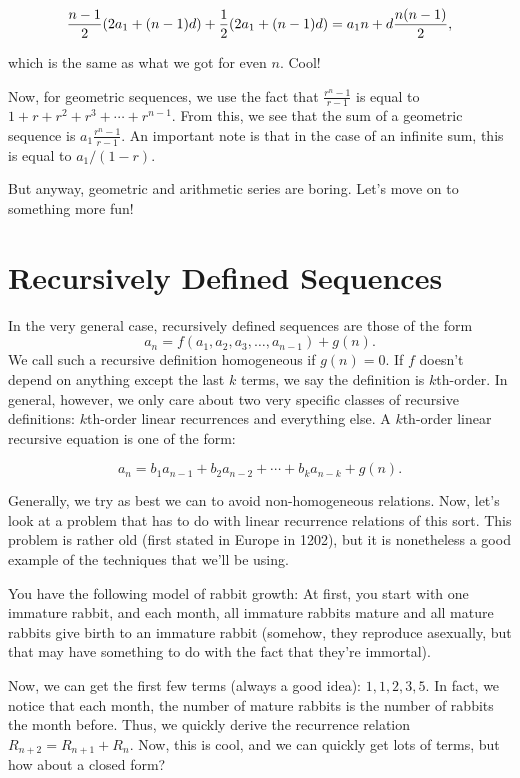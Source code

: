 \documentclass[12pt,letterpaper]{article}
\begin{document}
$$\frac{n-1}{2}(2a_1 + (n-1)d) + \frac{1}{2}(2a_1 + (n-1)d) \\
= a_1 n + d \frac{n (n-1)}{2},$$

which is the same as what we got for even $n$. Cool!

Now, for geometric sequences, we use the fact that $\frac{r^n - 1}{r
  - 1}$ is equal to $1 + r + r^2 + r^3 + \cdots + r^{n-1}$. From this, we
see that the sum of a geometric sequence is $a_1 \frac{r^n - 1}{r -
  1}$. An important note is that in the case of an infinite sum, this
is equal to $a_1/(1 - r)$.

But anyway, geometric and arithmetic series are boring. Let's move on to
something more fun!

\section{Recursively Defined Sequences}
In the very general case, recursively defined sequences are those of
the form $$a_n = f(a_1, a_2, a_3, \ldots, a_{n-1}) + g(n).$$ We call such a
recursive definition homogeneous if $g(n) = 0$. If $f$ doesn't depend
on anything except the last $k$ terms, we say the definition is
$k$th-order. In general, however, we only care about two very
specific classes of recursive definitions: $k$th-order linear recurrences and
everything else. A $k$th-order linear recursive equation is one of
the form:

$$a_n = b_1 a_{n-1} + b_2 a_{n-2} + \cdots + b_k a_{n - k} + g(n).$$

Generally, we try as best we can to avoid non-homogeneous
relations. Now, let's look at a problem that has to do with linear
recurrence relations of this sort. This problem is rather old (first stated
in Europe in 1202), but it is nonetheless a
good example of the techniques that we'll be using.

You have the following model of rabbit growth: At first, you start
with one immature rabbit, and each month, all immature rabbits mature
and all mature rabbits give birth to an immature rabbit (somehow, they
reproduce asexually, but that may have something to do with the fact
that they're immortal).

Now, we can get the first few terms (always a good idea): $1, 1, 2, 3,
5$.  In fact, we notice that each month, the number of mature rabbits
is the number of rabbits the month before. Thus, we quickly derive the
recurrence relation $R_{n+2} = R_{n+1} + R_n$. Now, this is cool, and
we can quickly get lots of terms, but how about a closed form?
\end{document}
